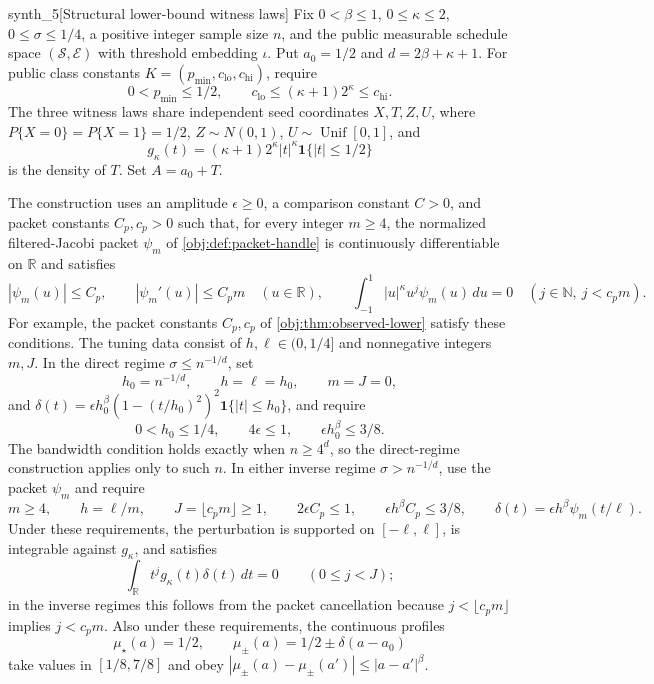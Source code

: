 \begin{definitionv}{synth_5}[Structural lower-bound witness laws]
Fix \(0<\beta\le1\), \(0\le\kappa\le2\), \(0\le\sigma\le1/4\), a positive integer sample size \(n\), and the public measurable schedule space \((\mathcal S,\mathcal E)\) with threshold embedding \(\iota\). Put \(a_0=1/2\) and \(d=2\beta+\kappa+1\). For public class constants \(K=(p_{\min},c_{\mathrm{lo}},c_{\mathrm{hi}})\), require
\[
0<p_{\min}\le1/2,\qquad
c_{\mathrm{lo}}\le(\kappa+1)2^\kappa\le c_{\mathrm{hi}}.
\]
The three witness laws share independent seed coordinates \(X,T,Z,U\), where \(P\{X=0\}=P\{X=1\}=1/2\), \(Z\sim N(0,1)\), \(U\sim\operatorname{Unif}[0,1]\), and
\[
g_\kappa(t)=(\kappa+1)2^\kappa|t|^\kappa\mathbf1\{|t|\le1/2\}
\]
is the density of \(T\). Set \(A=a_0+T\).

The construction uses an amplitude \(\epsilon\ge0\), a comparison constant \(C>0\), and packet constants \(C_p,c_p>0\) such that, for every integer \(m\ge4\), the normalized filtered-Jacobi packet \(\psi_m\) of \cref{obj:def:packet-handle} is continuously differentiable on \(\mathbb R\) and satisfies
\[
|\psi_m(u)|\le C_p,\qquad
|\psi_m'(u)|\le C_pm
\quad(u\in\mathbb R),
\qquad
\int_{-1}^{1}|u|^\kappa u^j\psi_m(u)\,du=0\quad(j\in\mathbb N,\ j<c_pm).
\]
For example, the packet constants \(C_p,c_p\) of \cref{obj:thm:observed-lower} satisfy these conditions. The tuning data consist of \(h,\ell\in(0,1/4]\) and nonnegative integers \(m,J\). In the direct regime \(\sigma\le n^{-1/d}\), set
\[
h_0=n^{-1/d},\qquad h=\ell=h_0,\qquad m=J=0,
\]
and \(\delta(t)=\epsilon h_0^\beta(1-(t/h_0)^2)^2\mathbf1\{|t|\le h_0\}\), and require
\[
0<h_0\le1/4,\qquad 4\epsilon\le1,\qquad \epsilon h_0^\beta\le3/8.
\]
The bandwidth condition holds exactly when \(n\ge4^d\), so the direct-regime construction applies only to such \(n\). In either inverse regime \(\sigma>n^{-1/d}\), use the packet \(\psi_m\) and require
\[
m\ge4,\qquad h=\ell/m,\qquad J=\lfloor c_pm\rfloor\ge1,
\qquad 2\epsilon C_p\le1,\qquad \epsilon h^\beta C_p\le3/8,
\qquad \delta(t)=\epsilon h^\beta\psi_m(t/\ell).
\]
Under these requirements, the perturbation is supported on \([-\ell,\ell]\), is integrable against \(g_\kappa\), and satisfies
\[
\int_{\mathbb R}t^jg_\kappa(t)\delta(t)\,dt=0\qquad(0\le j<J);
\]
in the inverse regimes this follows from the packet cancellation because \(j<\lfloor c_pm\rfloor\) implies \(j<c_pm\). Also under these requirements, the continuous profiles
\[
\mu_\star(a)=1/2,\qquad \mu_\pm(a)=1/2\pm\delta(a-a_0)
\]
take values in \([1/8,7/8]\) and obey \(|\mu_\pm(a)-\mu_\pm(a')|\le|a-a'|^\beta\).


\end{definitionv}
